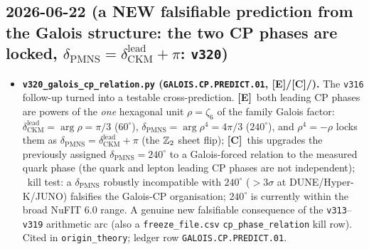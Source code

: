 \documentclass[11pt]{article}
\providecommand{\mE}{\textbf{[E]}}\providecommand{\mC}{\textbf{[C]}}
\begin{document}
\subsection*{2026-06-22 (a NEW falsifiable prediction from the Galois structure: the two CP phases are locked, $\delta_{\mathrm{PMNS}}=\delta_{\mathrm{CKM}}^{\mathrm{lead}}+\pi$: \texttt{v320})}
\begin{itemize}
\item \textbf{\texttt{v320\_galois\_cp\_relation.py} (\texttt{GALOIS.CP.PREDICT.01}, \mE/\mC/\mX).} The \texttt{v316}
  follow-up turned into a testable cross-prediction. \mE\ both leading CP phases are powers of the \emph{one}
  hexagonal unit $\rho=\zeta_6$ of the family Galois factor: $\delta_{\mathrm{CKM}}^{\mathrm{lead}}=\arg\rho=\pi/3$
  ($60^\circ$), $\delta_{\mathrm{PMNS}}=\arg\rho^4=4\pi/3$ ($240^\circ$), and $\rho^4=-\rho$ locks them as
  $\delta_{\mathrm{PMNS}}=\delta_{\mathrm{CKM}}^{\mathrm{lead}}+\pi$ (the $\mathbb{Z}_2$ sheet flip); \mC\ this upgrades the
  previously assigned $\delta_{\mathrm{PMNS}}=240^\circ$ to a Galois-forced relation to the measured quark phase
  (the quark and lepton leading CP phases are not independent); \mX\ kill test: a $\delta_{\mathrm{PMNS}}$ robustly
  incompatible with $240^\circ$ ($>3\sigma$ at DUNE/Hyper-K/JUNO) falsifies the Galois-CP organisation; $240^\circ$
  is currently within the broad NuFIT 6.0 range. A genuine new falsifiable consequence of the \texttt{v313}--%
  \texttt{v319} arithmetic arc (also a \texttt{freeze\_file.csv} \texttt{cp\_phase\_relation} kill row). Cited in
  \texttt{origin\_theory}; ledger row \texttt{GALOIS.CP.PREDICT.01}.
\end{itemize}
\end{document}
